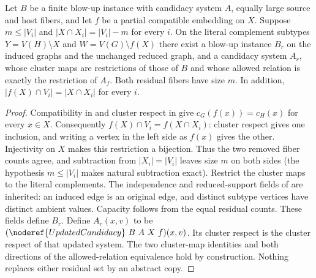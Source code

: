 \begin{lemma}
Let $B$ be a finite blow-up instance with candidacy system $A$, equally
large source and host fibers, and let $f$ be a partial compatible embedding
on $X$. Suppose $m\leq |V_i|$ and $|X\cap X_i|=|V_i|-m$ for every $i$.
On the literal complement subtypes $Y=V(H)\setminus X$ and
$W=V(G)\setminus f(X)$ there exist a blow-up instance $B_r$ on the induced
graphs and the unchanged reduced graph, and a candidacy system $A_r$,
whose cluster maps are restrictions of those of $B$ and whose allowed
relation is exactly the restriction of $A_f$. Both residual fibers have
size $m$. In addition,
$|f(X)\cap V_i|=|X\cap X_i|$ for every $i$.
\end{lemma}
\begin{proof}
Compatibility in  and cluster respect
in  give $c_G(f(x))=c_H(x)$ for every $x\in X$.
Consequently $f(X)\cap V_i=f(X\cap X_i)$: cluster respect gives one
inclusion, and writing a vertex in the left side as $f(x)$ gives the other.
Injectivity on $X$ makes this restriction a bijection. Thus the two removed
fiber counts agree, and subtraction from $|X_i|=|V_i|$ leaves size $m$
on both sides (the hypothesis $m\leq |V_i|$ makes natural subtraction exact).
Restrict the cluster maps to the literal complements. The independence
and reduced-support fields of  are inherited:
an induced edge is an original edge, and distinct subtype vertices have
distinct ambient values. Capacity follows from the equal residual counts.
These fields define $B_r$. Define $A_r(x,v)$ to be
$(\noderef{UpdatedCandidacy}\ B\ A\ X\ f)(x,v)$. Its cluster respect is
the cluster respect of that updated system. The two cluster-map identities
and both directions of the allowed-relation equivalence hold by
construction. Nothing replaces either residual set by an abstract copy.
\end{proof}
